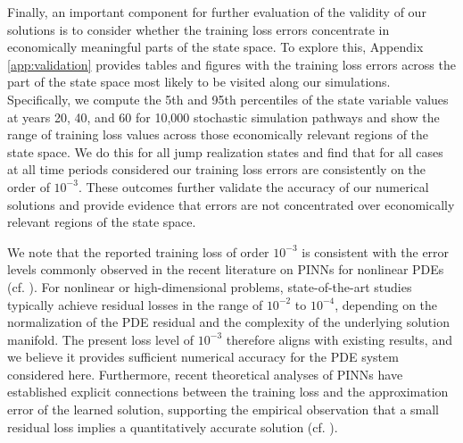 \documentclass[12pt]{article}
\newcommand{\rh}[1]{\textcolor{orange}{\textsf{[RH: #1]}}}
\begin{document}
 Finally, an important component for further evaluation of the validity of our solutions is to consider whether the training loss errors concentrate in economically meaningful parts of the state space. To explore this, Appendix \ref{app:validation} provides tables and figures with the training loss errors across the part of the state space most likely to be visited along our simulations. Specifically, we compute the 5th and 95th percentiles of the state variable values at years 20, 40, and 60 for 10,000 stochastic simulation pathways and show the range of training loss values across those economically relevant regions of the state space. We do this for all jump realization states and find that for all cases at all time periods considered our training loss errors are consistently on the order of $10^{-3}$. These outcomes further validate the accuracy of our numerical solutions and provide evidence that errors are not concentrated over economically relevant regions of the state space.


We note that the reported training loss of order $10^{-3}$ is consistent with the error levels commonly observed in the recent literature on PINNs for nonlinear PDEs (cf. \cite{wang2021understanding,jagtap2020adaptive,qian2023error,liu2022physics,bischof2025multi}). For nonlinear or high-dimensional problems, state-of-the-art studies typically achieve residual losses in the range of $10^{-2}$ to $10^{-4}$, depending on the normalization of the PDE residual and the complexity of the underlying solution manifold. The present loss level of $10^{-3}$  therefore aligns with existing results, and we believe it provides sufficient numerical accuracy for the PDE system considered here. Furthermore, recent theoretical analyses of PINNs have established explicit connections between the training loss and the approximation error of the learned solution, supporting the empirical observation that a small residual loss implies a quantitatively accurate solution (cf. \cite{de2022error,de2024error,jiao2021rate,hu2023higher,Abdo2025neural}).
\end{document}
